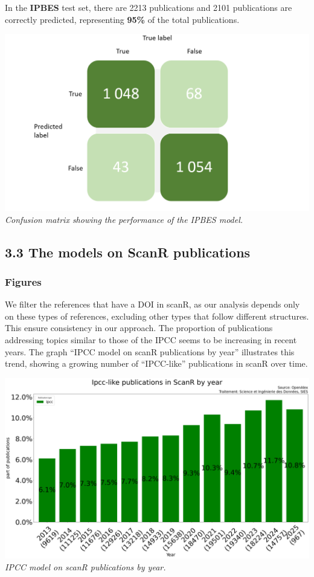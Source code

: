 \documentclass[
]{article}
\begin{document}
In the \textbf{IPBES} test set, there are 2213 publications and 2101
publications are correctly predicted, representing \textbf{95\%} of the
total publications.

\includegraphics{./images/teds_ipbes_model.png} \emph{Confusion matrix
showing the performance of the IPBES model.}

\hypertarget{the-models-on-scanr-publications}{%
\subsection{3.3 The models on ScanR
publications}\label{the-models-on-scanr-publications}}

\hypertarget{figures}{%
\subsubsection{Figures}\label{figures}}

We filter the references that have a DOI in scanR, as our analysis
depends only on these types of references, excluding other types that
follow different structures. This ensure consistency in our approach.
The proportion of publications addressing topics similar to those of the
IPCC seems to be increasing in recent years. The graph ``IPCC model on
scanR publications by year'' illustrates this trend, showing a growing
number of ``IPCC-like'' publications in scanR over time.

\includegraphics{./images/teds_model_scanR1.png} \emph{IPCC model on
scanR publications by year.}
\end{document}
